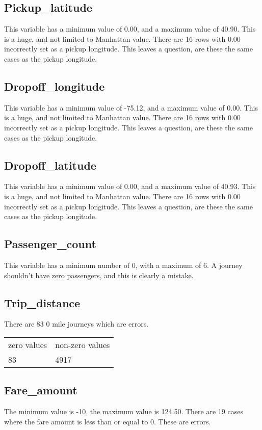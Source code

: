 \documentclass{article}
\begin{document}
\subsection{Pickup\_latitude}
This variable has a minimum value of 0.00, and a maximum value of 40.90. This is a huge, and not limited to Manhattan value. There are 16 rows with 0.00 incorrectly set as a pickup longitude. This leaves a question, are these the same cases as the pickup longitude.


\subsection{Dropoff\_longitude}
This variable has a minimum value of -75.12, and a maximum value of 0.00. This is a huge, and not limited to Manhattan value. There are 16 rows with 0.00 incorrectly set as a pickup longitude. This leaves a question, are these the same cases as the pickup longitude.

\subsection{Dropoff\_latitude}
This variable has a minimum value of 0.00, and a maximum value of 40.93. This is a huge, and not limited to Manhattan value. There are 16 rows with 0.00 incorrectly set as a pickup longitude. This leaves a question, are these the same cases as the pickup longitude.

\subsection{Passenger\_count}
This variable has a minimum number of 0, with a maximum of 6. A journey shouldn't have zero passengers, and this is clearly a mistake.

\subsection{Trip\_distance}
There are 83 0 mile journeys which are errors.
\begin{table}[H]
\centering
\begin{tabular}{ll}
zero values    & non-zero values  \\
83 & 4917
\end{tabular}
\end{table}


\subsection{Fare\_amount}
The minimum value is -10, the maximum value is 124.50. There are 19 cases where the fare amount is less than or equal to 0. These are errors.
\end{document}

